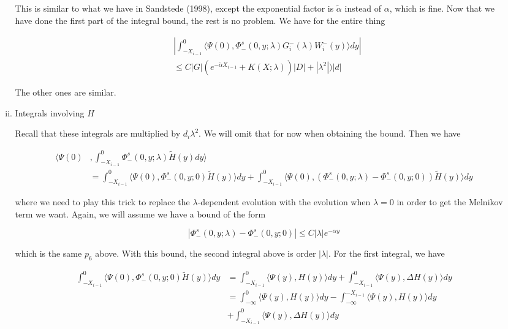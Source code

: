 \documentclass[12pt]{article}
\begin{document}
\begin{enumerate}
\begin{enumerate}[(i)]
This is similar to what we have in Sandstede (1998), except the exponential factor is $\tilde{\alpha}$ instead of $\alpha$, which is fine. Now that we have done the first part of the integral bound, the rest is no problem. We have for the entire thing 

\begin{align*}
&\left| \int_{-X_{i-1}}^0 \langle \Psi(0), \Phi^s_-(0, y; \lambda) G_i^-(\lambda)W_i^-(y) \rangle dy \right| \\
&\leq C |G| ( e^{-\tilde{\alpha} X_{i-1}} + K(X; \lambda))|D| + |\lambda^2|)|d|
\end{align*}

The other ones are similar.

\item Integrals involving $H$

Recall that these integrals are multiplied by $d_i \lambda^2$. We will omit that for now when obtaining the bound. Then we have

\begin{align*}
\langle \Psi(0)&, \int_{-X_{i-1}}^0 \Phi^s_-(0, y; \lambda) \tilde{H}(y) dy \rangle \\ 
&= \int_{-X_{i-1}}^0 \langle \Psi(0), \Phi^s_-(0, y; 0) \tilde{H}(y) \rangle dy + 
\int_{-X_{i-1}}^0 \langle \Psi(0), (\Phi^s_-(0, y; \lambda) - \Phi^s_-(0, y; 0)) \tilde{H}(y) \rangle dy
\end{align*}

where we need to play this trick to replace the $\lambda$-dependent evolution with the evolution when $\lambda = 0$ in order to get the Melnikov term we want. Again, we will assume we have a bound of the form

\[
|\Phi^s_-(0, y; \lambda) - \Phi^s_-(0, y; 0)| \leq C |\lambda| e^{-\alpha y}
\]

which is the same $p_6$ above. With this bound, the second integral above is order $|\lambda|$. For the first integral, we have 

\begin{align*}
\int_{-X_{i-1}}^0 \langle \Psi(0), \Phi^s_-(0, y; 0) \tilde{H}(y) \rangle dy &= 
\int_{-X_{i-1}}^0 \langle \Psi(y), H(y) \rangle dy + \int_{-X_{i-1}}^0 \langle \Psi(y), \Delta H(y) \rangle dy \\
&= \int_{-\infty}^0 \langle \Psi(y), H(y) \rangle dy - \int_{-\infty}^{-X_{i-1}} \langle \Psi(y), H(y) \rangle dy \\
&+ \int_{-X_{i-1}}^0 \langle \Psi(y), \Delta H(y) \rangle dy 
\end{align*}


\end{enumerate}
\end{enumerate}
\end{document}
